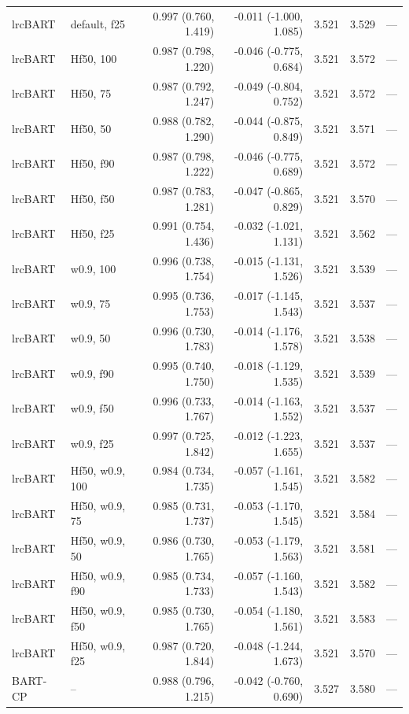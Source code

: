 \begin{landscape}
\begin{longtable}{llrrrrr}
lrcBART & default, f25 & 0.997 (0.760, 1.419) & -0.011 (-1.000, 1.085) & 3.521 & 3.529 & --- \\
lrcBART & Hf50, 100 & 0.987 (0.798, 1.220) & -0.046 (-0.775, 0.684) & 3.521 & 3.572 & --- \\
lrcBART & Hf50, 75 & 0.987 (0.792, 1.247) & -0.049 (-0.804, 0.752) & 3.521 & 3.572 & --- \\
lrcBART & Hf50, 50 & 0.988 (0.782, 1.290) & -0.044 (-0.875, 0.849) & 3.521 & 3.571 & --- \\
lrcBART & Hf50, f90 & 0.987 (0.798, 1.222) & -0.046 (-0.775, 0.689) & 3.521 & 3.572 & --- \\
lrcBART & Hf50, f50 & 0.987 (0.783, 1.281) & -0.047 (-0.865, 0.829) & 3.521 & 3.570 & --- \\
lrcBART & Hf50, f25 & 0.991 (0.754, 1.436) & -0.032 (-1.021, 1.131) & 3.521 & 3.562 & --- \\
lrcBART & w0.9, 100 & 0.996 (0.738, 1.754) & -0.015 (-1.131, 1.526) & 3.521 & 3.539 & --- \\
lrcBART & w0.9, 75 & 0.995 (0.736, 1.753) & -0.017 (-1.145, 1.543) & 3.521 & 3.537 & --- \\
lrcBART & w0.9, 50 & 0.996 (0.730, 1.783) & -0.014 (-1.176, 1.578) & 3.521 & 3.538 & --- \\
lrcBART & w0.9, f90 & 0.995 (0.740, 1.750) & -0.018 (-1.129, 1.535) & 3.521 & 3.539 & --- \\
lrcBART & w0.9, f50 & 0.996 (0.733, 1.767) & -0.014 (-1.163, 1.552) & 3.521 & 3.537 & --- \\
lrcBART & w0.9, f25 & 0.997 (0.725, 1.842) & -0.012 (-1.223, 1.655) & 3.521 & 3.537 & --- \\
lrcBART & Hf50, w0.9, 100 & 0.984 (0.734, 1.735) & -0.057 (-1.161, 1.545) & 3.521 & 3.582 & --- \\
lrcBART & Hf50, w0.9, 75 & 0.985 (0.731, 1.737) & -0.053 (-1.170, 1.545) & 3.521 & 3.584 & --- \\
lrcBART & Hf50, w0.9, 50 & 0.986 (0.730, 1.765) & -0.053 (-1.179, 1.563) & 3.521 & 3.581 & --- \\
lrcBART & Hf50, w0.9, f90 & 0.985 (0.734, 1.733) & -0.057 (-1.160, 1.543) & 3.521 & 3.582 & --- \\
lrcBART & Hf50, w0.9, f50 & 0.985 (0.730, 1.765) & -0.054 (-1.180, 1.561) & 3.521 & 3.583 & --- \\
lrcBART & Hf50, w0.9, f25 & 0.987 (0.720, 1.844) & -0.048 (-1.244, 1.673) & 3.521 & 3.570 & --- \\
BART-CP & -- & 0.988 (0.796, 1.215) & -0.042 (-0.760, 0.690) & 3.527 & 3.580 & --- \\

\end{longtable}
\end{landscape}
